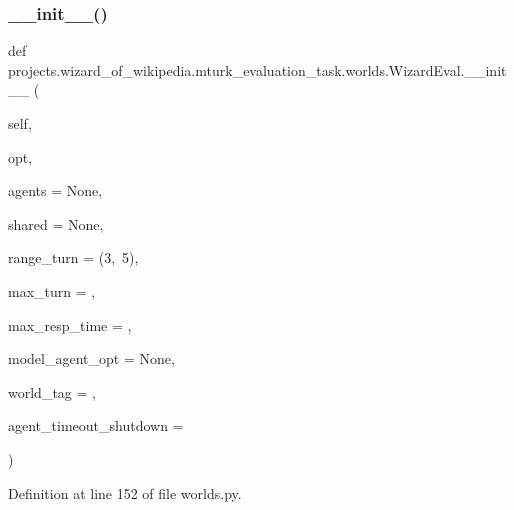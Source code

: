 \subsubsection{\texorpdfstring{\+\_\+\+\_\+init\+\_\+\+\_\+()}{\_\_init\_\_()}}
{\footnotesize\ttfamily def projects.\+wizard\+\_\+of\+\_\+wikipedia.\+mturk\+\_\+evaluation\+\_\+task.\+worlds.\+Wizard\+Eval.\+\_\+\+\_\+init\+\_\+\+\_\+ (\begin{DoxyParamCaption}\item[{}]{self,  }\item[{}]{opt,  }\item[{}]{agents = {\ttfamily None},  }\item[{}]{shared = {\ttfamily None},  }\item[{}]{range\+\_\+turn = {\ttfamily (3,~5)},  }\item[{}]{max\+\_\+turn = {},  }\item[{}]{max\+\_\+resp\+\_\+time = {},  }\item[{}]{model\+\_\+agent\+\_\+opt = {\ttfamily None},  }\item[{}]{world\+\_\+tag = {\ttfamily \textquotesingle{}\textquotesingle{}},  }\item[{}]{agent\+\_\+timeout\+\_\+shutdown = {} }\end{DoxyParamCaption})}



Definition at line 152 of file worlds.\+py.


